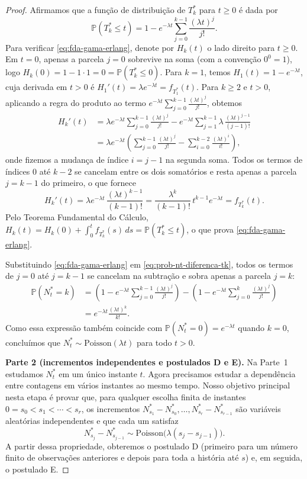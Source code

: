\documentclass[12pt,portuguese]{article}
\theoremstyle{definition}
\theoremstyle{plainexercise}
\theoremstyle{starredexercise}
\theoremstyle{definition}
\begin{document}
\begin{proof}
Afirmamos que a função de distribuição de $T_k^*$ para $t\geqslant0$ é dada por
\begin{equation}\label{eq:fda-gama-erlang}
  \mathbb{P}(T_k^*\leqslant t)
  =1-e^{-\lambda t}\sum_{j=0}^{k-1}\frac{(\lambda t)^j}{j!}.
\end{equation}
Para verificar \eqref{eq:fda-gama-erlang}, denote por $H_k(t)$ o lado direito
para $t\geqslant0$. Em $t=0$, apenas a parcela $j=0$ sobrevive na soma (com a
convenção $0^0=1$), logo $H_k(0)=1-1\cdot 1=0=\mathbb{P}(T_k^*\leqslant0)$.
Para $k=1$, temos $H_1(t)=1-e^{-\lambda t}$, cuja derivada em $t>0$ é
$H_1'(t)=\lambda e^{-\lambda t}=f_{T_1^*}(t)$. Para $k\geqslant2$ e $t>0$,
aplicando a regra do produto ao termo
$e^{-\lambda t}\sum_{j=0}^{k-1}\frac{(\lambda t)^j}{j!}$, obtemos
\begin{align*}
  H_k'(t)
  &=\lambda e^{-\lambda t}\sum_{j=0}^{k-1}\frac{(\lambda t)^j}{j!}
    -e^{-\lambda t}\sum_{j=1}^{k-1}\lambda\,\frac{(\lambda t)^{j-1}}{(j-1)!}
  \\[0.3cm]
  &=\lambda e^{-\lambda t}\left(
    \sum_{j=0}^{k-1}\frac{(\lambda t)^j}{j!}
    -\sum_{i=0}^{k-2}\frac{(\lambda t)^i}{i!}
  \right),
\end{align*}
onde fizemos a mudança de índice $i=j-1$ na segunda soma. Todos os termos de
índices $0$ até $k-2$ se cancelam entre os dois somatórios e resta apenas a
parcela $j=k-1$ do primeiro, o que fornece
\[
  H_k'(t)
  =\lambda e^{-\lambda t}\,\frac{(\lambda t)^{k-1}}{(k-1)!}
  =\frac{\lambda^k}{(k-1)!}\,t^{k-1}e^{-\lambda t}
  =f_{T_k^*}(t).
\]
Pelo Teorema Fundamental do Cálculo,
$H_k(t)=H_k(0)+\int_0^t f_{T_k^*}(s)\,ds=\mathbb{P}(T_k^*\leqslant t)$, o que
prova \eqref{eq:fda-gama-erlang}.

Substituindo \eqref{eq:fda-gama-erlang} em \eqref{eq:prob-nt-diferenca-tk},
todos os termos de $j=0$ até $j=k-1$ se cancelam na subtração e sobra apenas a
parcela $j=k$:
\begin{align*}
  \mathbb{P}(N_t^*=k)
  &=\left(1-e^{-\lambda t}\sum_{j=0}^{k-1}\frac{(\lambda t)^j}{j!}\right)
   -\left(1-e^{-\lambda t}\sum_{j=0}^{k}\frac{(\lambda t)^j}{j!}\right)
  \\[0.3cm]
  &=e^{-\lambda t}\frac{(\lambda t)^k}{k!}.
\end{align*}
Como essa expressão também coincide com $\mathbb{P}(N_t^*=0)=e^{-\lambda t}$
quando $k=0$, concluímos que $N_t^*\sim\mathrm{Poisson}(\lambda t)$ para todo
$t>0$.

\medskip
\noindent\textbf{Parte 2 (incrementos independentes e postulados D e E).}
Na Parte~1 estudamos $N_t^*$ em um único instante $t$. Agora precisamos estudar
a dependência entre contagens em vários instantes ao mesmo tempo. Nosso
objetivo principal nesta etapa é provar que, para qualquer escolha finita de
instantes $0=s_0<s_1<\cdots<s_r$, os incrementos
$N_{s_1}^*-N_{s_0}^*,\ldots,N_{s_r}^*-N_{s_{r-1}}^*$ são variáveis aleatórias
independentes e que cada um satisfaz
\[
  N_{s_j}^*-N_{s_{j-1}}^* \sim \mathrm{Poisson}\bigl(\lambda(s_j-s_{j-1})\bigr).
\]
A partir dessa propriedade, obteremos o postulado D (primeiro para um número
finito de observações anteriores e depois para toda a história até $s$) e, em
seguida, o postulado E.


\end{proof}
\end{document}
